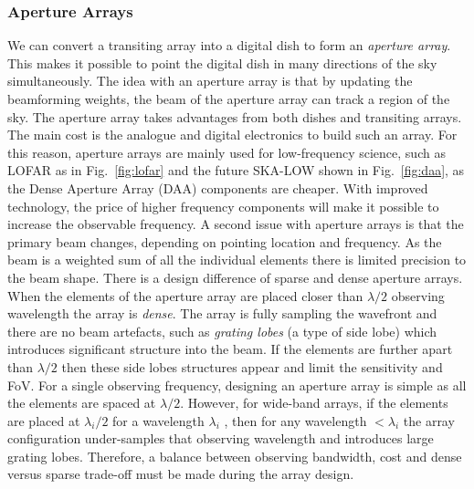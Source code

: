 
  
\subsubsection{Aperture Arrays}	   \label{chap2:sec4.3.3}
%
We can convert a transiting array into a digital dish to form an \textit{aperture array}. This makes it possible to point the digital dish in many directions of the sky 
simultaneously. The idea with an aperture array is that by updating the beamforming weights, the beam of the aperture array can track a region of the sky. The aperture array takes
advantages from both dishes and transiting arrays. The main cost is the analogue and digital electronics to build such an array. For this reason, aperture arrays are 
mainly used for low-frequency science, such as LOFAR as in Fig.~\ref{fig:lofar} and the future SKA-LOW shown in Fig.~\ref{fig:daa}, as the Dense Aperture Array (DAA) 
components are cheaper. With improved technology, the price of higher frequency components will make it possible to increase the observable frequency. A second issue with aperture arrays is that the primary beam changes, depending on pointing location 
and frequency. As the beam is a weighted sum of all the individual elements there is limited precision to the beam shape. There is a design difference of sparse 
and dense aperture arrays. When the elements of the aperture array are placed closer than $\lambda/2$ observing wavelength the array is \textit{dense}. The array is
fully sampling the wavefront and there are no beam artefacts, such as \textit{grating lobes} (a type of side lobe) which introduces significant structure into the beam. 
If the elements are further apart than $\lambda/2$ then these side lobes structures appear and limit the sensitivity and FoV. For a single observing frequency,
designing an aperture array is simple as all the elements are spaced at $\lambda/2$. However, for wide-band arrays, if the elements are placed at $\lambda_{i}/2$
for a wavelength $\lambda_{i}$ , then for any wavelength $< \lambda_{i}$ the array configuration under-samples that observing wavelength and introduces large grating lobes. 
Therefore, a balance between observing bandwidth, cost and dense versus sparse trade-off must be made during the array design.



